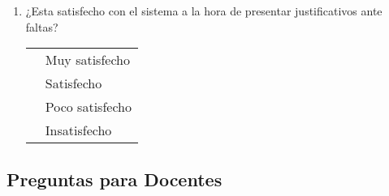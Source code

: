 \documentclass[12pt, a4paper]{article}
\newcommand{\checkbox}{\fbox{\rule{0pt}{1.5ex}\rule{1.5ex}{0pt}}}
\begin{document}
\begin{enumerate}[label=\textbf{A\arabic*}.]
                                                                                                                \item ¿Esta satisfecho con el sistema a la hora de presentar justificativos ante faltas?\\
                                                                                                                    \begin{tabular}{ll}
                                                                                                                    \checkbox & Muy satisfecho \\
                                                                                                                        \checkbox & Satisfecho \\
                                                                                                                        \checkbox & Poco satisfecho \\
                                                                                                                        \checkbox & Insatisfecho \\
                                                                                                                        \end{tabular}
                                                                                                                        \end{enumerate}

                                                                                                                        \subsection*{Preguntas para Docentes}
\end{document}
